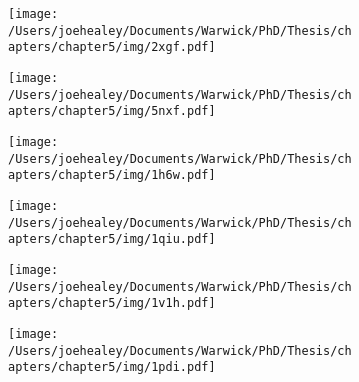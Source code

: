 \vspace{0.1cm}
\begin{figure}[p]

\centering
    \begin{subfigure}{\textwidth}
        \centering
        \texttt{[image: /Users/joehealey/Documents/Warwick/PhD/Thesis/chapters/chapter5/img/2xgf.pdf]}
        \captionsetup{singlelinecheck=off, justification=centering, font=footnotesize, aboveskip=10pt}
        \caption{}
    \end{subfigure}%
    
     \begin{subfigure}{\textwidth}
        \centering
        \texttt{[image: /Users/joehealey/Documents/Warwick/PhD/Thesis/chapters/chapter5/img/5nxf.pdf]}
        \captionsetup{singlelinecheck=off, justification=centering, font=footnotesize, aboveskip=10pt}
        \caption{}
    \end{subfigure}%
    
    \begin{subfigure}{0.49\textwidth}
            \centering
            {%
            \texttt{[image: /Users/joehealey/Documents/Warwick/PhD/Thesis/chapters/chapter5/img/1h6w.pdf]}
            }%
            \captionsetup{singlelinecheck=off, justification=centering, font=footnotesize, aboveskip=10pt}
            \caption{}
        \end{subfigure}%
            \begin{subfigure}{0.49\textwidth}
            \centering
            {%
            \texttt{[image: /Users/joehealey/Documents/Warwick/PhD/Thesis/chapters/chapter5/img/1qiu.pdf]}
            }%
            \captionsetup{singlelinecheck=off, justification=centering, font=footnotesize, aboveskip=10pt}
            \caption{}
            \label{1qiu}
        \end{subfigure}%
        
        \begin{subfigure}{0.49\textwidth}
            \centering
            {%
            \texttt{[image: /Users/joehealey/Documents/Warwick/PhD/Thesis/chapters/chapter5/img/1v1h.pdf]}
            }%
           \captionsetup{singlelinecheck=off, justification=centering, font=footnotesize, aboveskip=10pt}
            \caption{}
            \label{1v1h}
        \end{subfigure}%
        \begin{subfigure}{0.49\textwidth}
            \centering
            {%
            \texttt{[image: /Users/joehealey/Documents/Warwick/PhD/Thesis/chapters/chapter5/img/1pdi.pdf]}
            }%
           \captionsetup{singlelinecheck=off, justification=centering, font=footnotesize, aboveskip=10pt}
            \caption{}            
        \end{subfigure}%
        

\end{figure}
